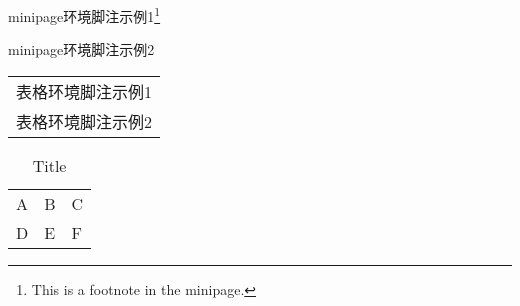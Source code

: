 \documentclass[twoside]{ctexart}
\begin{document}
            \begin{minipage}{\linewidth}
                minipage环境脚注示例1\footnote{This is a footnote in the minipage.} %

                minipage环境脚注示例2\footnotemark %
            \end{minipage}

            \begin{tabular}{l}
                表格环境脚注示例1\footnotemark\\
                表格环境脚注示例2\footnotemark
            \end{tabular}
            


            \begin{table}
                \centering
                \caption{Title\protect\footnotemark}
                \begin{tabular}{l|l|l}
                    \hline
                    A&B&C\\
                    D&E&F\\
                    \hline
                \end{tabular}
            \end{table}
\end{document}
